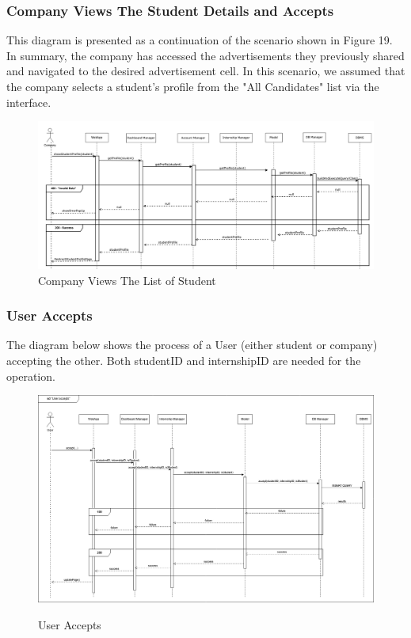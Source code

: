 \documentclass[a4paper,12pt]{article}
\begin{document}
\subsubsection*{ Company Views The Student Details and Accepts} 
This diagram is presented as a continuation of the scenario shown in Figure 19. In summary, the company has accessed the advertisements they previously shared and navigated to the desired advertisement cell. In this scenario, we assumed that the company selects a student's profile from the "All Candidates" list via the interface. 
\begin{figure}[H]
    \centering
    \includegraphics[scale = 0.7]{DD_figures/RuntimeView/companyViewStudentDetails.drawio.png}
    \caption{Company Views The List of Student}
    \centering
\end{figure}

\newpage

\subsubsection*{User Accepts}
The diagram below shows the process of a User (either student or company) accepting the other. Both studentID and internshipID are needed for the operation.
\begin{figure}[H]
\centering
\includegraphics[scale = 0.4]{DD_figures/RuntimeView/UserAcceptsRV.png}\\
\caption{User Accepts}
\end{figure}
\newpage
\end{document}
